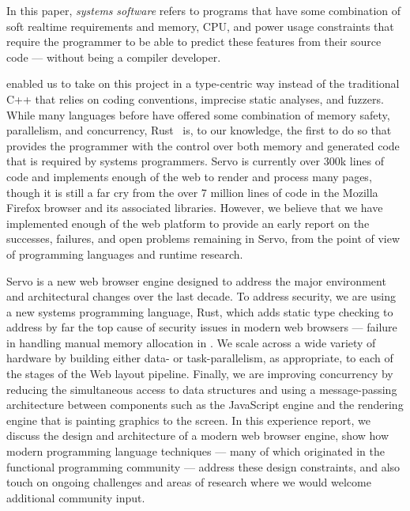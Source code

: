 In this paper, \emph{systems} \emph{software} refers to programs that have some combination
of soft realtime requirements and memory, CPU, and power usage constraints that require the
programmer to be able to predict these features from their source code --- without being a
compiler developer.

enabled us to take on this project in a type-centric way instead of
the traditional C++ that relies on coding conventions, imprecise static analyses, and
fuzzers.
While many languages before have offered some combination of memory safety, parallelism,
and concurrency, Rust~\cite{RUST} is, to our knowledge, the first to do so that provides the programmer
with the control over both memory and generated code that is required by systems programmers.
Servo is currently over 300k lines of code and implements enough of the web to render and
process many pages, though it is still a far cry from the over 7 million lines of code in
the Mozilla Firefox browser and its associated libraries.
However, we believe that we have implemented enough of the web platform to provide an
early report on the successes, failures, and open problems remaining in Servo, from the
point of view of programming languages and runtime research.


Servo is a new web browser engine designed to address the major environment and 
architectural changes over the last decade.
To address security, we are using a new systems programming language, Rust,
which adds static type checking to address by far the top cause of security
issues in modern web browsers --- failure in handling manual memory allocation
in \Cplusplus{}.
We scale across a wide variety of hardware by building either data- or task-parallelism, 
as appropriate, to each of the stages of the Web layout pipeline.
Finally, we are improving concurrency by reducing the simultaneous access to data
structures and using a message-passing architecture between components such as the
JavaScript engine and the rendering engine that is painting graphics to the screen.
In this experience report, we discuss the design and architecture of a modern web 
browser engine, show how modern programming language techniques --- many of which
originated in the functional programming community --- address these design 
constraints, and also touch on ongoing challenges and areas of research where we
would welcome additional community input.

